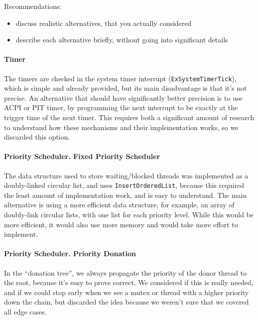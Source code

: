 Recommendations:
\begin{itemize}
    \item discuss realistic alternatives, that you actually considered
    \item describe each alternative briefly, without going into significant details
\end{itemize}

\begin{tcolorbox}[title={Example}]
\paragraph{Timer} The timers are checked in the system timer interrupt (\lstinline{ExSystemTimerTick}), which is simple and already provided, but
its main disadvantage is that it's not precise. An alternative that should have significantly better precision is to use ACPI or PIT timer, by
programming the next interrupt to be exactly at the trigger time of the next timer. This requires both a significant amount of
research to understand how these mechanisms and their implementation works, so we discarded this option.

\paragraph{Priority Scheduler. Fixed Priority Scheduler} The data structure used to store waiting/blocked threads was implemented as a doubly-linked circular list, and uses \lstinline{InsertOrderedList},
because this required the least amount of implementation work, and is easy to understand.
The main alternative is using a more efficient data structure, for example, an array of doubly-link circular lists, with one list for each priority level. While this would be more efficient, it would also use more memory
and would take more effort to implement.

\paragraph{Priority Scheduler. Priority Donation} In the ``donation tree'', we always propagate the priority of the donor thread to the root, because
it's easy to prove correct. We considered if this is really needed, and if we could stop early when we see a mutex or thread with a higher priority
down the chain, but discarded the idea because we weren't sure that we covered all edge cases.
\end{tcolorbox}

